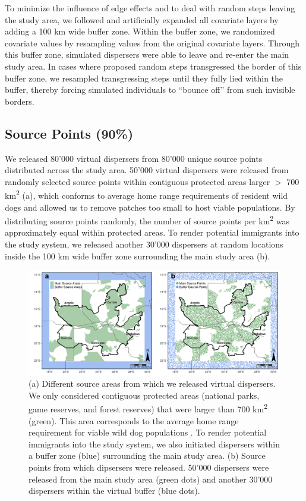 \documentclass[abstract=on,10pt,a4paper,bibliography=totocnumbered]{article}
\begin{document}
To minimize the influence of edge effects and to deal with random steps leaving
the study area, we followed \citep{Koen.2010} and artificially expanded all
covariate layers by adding a 100 km wide buffer zone. Within the buffer zone, we
randomized covariate values by resampling values from the original covariate
layers. Through this buffer zone, simulated dispersers were able to leave and
re-enter the main study area. In cases where proposed random steps transgressed
the border of this buffer zone, we resampled transgressing steps until they
fully lied within the buffer, thereby forcing simulated individuals to ``bounce
off'' from such invisible borders.

\subsection{Source Points (90\%)}
We released 80'000 virtual dispersers from 80'000 unique source points
distributed across the study area. 50'000 virtual dispersers were released from
randomly selected source points within contiguous protected areas larger \(>\)
700 km\textsuperscript{2} (a), which conforms to average home
range requirements of resident wild dogs \citep{Pomilia.2015} and allowed us to
remove patches too small to host viable populations. By distributing source
points randomly, the number of source points per km\textsuperscript{2} was
approximately equal within protected areas. To render potential immigrants into
the study system, we released another 30'000 dispersers at random locations
inside the 100 km wide buffer zone surrounding the main study area
(b).

\begin{figure}[htbp]
  \begin{center}
    \includegraphics[width = \textwidth]{99_SourceAreas.png}
    \caption{(a) Different source areas from which we released virtual
    dispersers. We only considered contiguous protected areas (national parks,
    game reserves, and forest reserves) that were larger than 700
    km\textsuperscript{2} (green). This area corresponds to the average home
    range requirement for viable wild dog populations \citep{Pomilia.2015}. To
    render potential immigrants into the study system, we also initiated
    dispersers within a buffer zone (blue) surrounding the main study area. (b)
    Source points from which dipsersers were released. 50'000 dispersers were
    released from the main study area (green dots) and another 30'000 dispersers
    within the virtual buffer (blue dots).}
    \label{SourcePoints}
  \end{center}
\end{figure}
\end{document}
